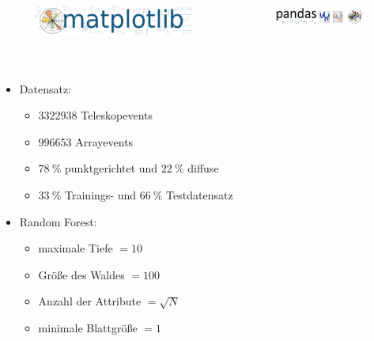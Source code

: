 \documentclass[aspectratio=1610, professionalfonts, 9pt]{beamer}
\begin{document}
\begin{frame}
\begin{columns}
      \vspace{0.6cm}

      \begin{figure}
        \includegraphics[width=\textwidth]{pictures/matplotlib.png}
      \end{figure}

      \vspace{0.6cm}

      \begin{figure}
        \includegraphics[width=\textwidth]{pictures/pandas.png}
      \end{figure}
    \end{columns}
  \end{frame}

  \section{}

  \begin{frame}
    \printbibliography
  \end{frame}

  \begin{frame}
    \begin{itemize}
      \item Datensatz:
        \begin{itemize}
          \item $\num{3322938}$ Teleskopevents
          \item $\num{996653}$ Arrayevents
          \item $\SI{78}{\percent}$ punktgerichtet und $\SI{22}{\percent}$ diffuse
          \item $\SI{33}{\percent}$ Trainings- und $\SI{66}{\percent}$ Testdatensatz
        \end{itemize}
      \item Random Forest:
        \begin{itemize}
          \item maximale Tiefe $=\num{10}$
          \item Größe des Waldes $=\num{100}$
          \item Anzahl der Attribute $=\sqrt{N}$
          \item minimale Blattgröße $=\num{1}$
        \end{itemize}
    \end{itemize}
  \end{frame}
\end{document}
